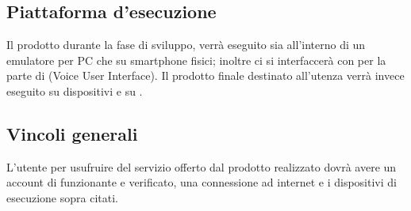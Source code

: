\subsection{Piattaforma d'esecuzione}
Il prodotto durante la fase di sviluppo, verrà eseguito sia all'interno di un emulatore  per PC che su smartphone  fisici; inoltre ci si interfaccerà con   per la parte di  (Voice User Interface).
Il prodotto finale destinato all'utenza verrà invece eseguito su dispositivi  e su  .
\subsection{Vincoli generali}
L'utente per usufruire del servizio offerto dal prodotto realizzato dovrà avere un account di  funzionante e verificato, una connessione ad internet e i dispositivi di esecuzione sopra citati. 
